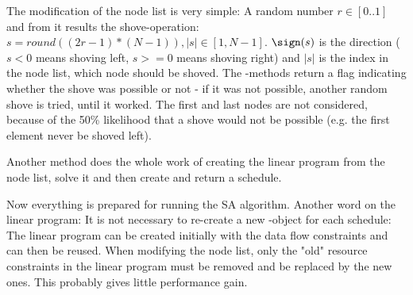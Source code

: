 The modification of the node list is very simple: A random number $r \in [0..1]$ and from it results the shove-operation: $s = round((2r-1)*(N-1)), |s| \in [1, N-1]$. $\sign(s)$ is the direction ($s<0$ means shoving left, $s>=0$ means shoving right) and $|s|$ is the index in the node list, which node should be shoved. The -methods return a flag indicating whether the shove was possible or not - if it was not possible, another random shove is tried, until it worked. The first and last nodes are not considered, because of the 50\% likelihood that a shove would not be possible (e.g. the first element never be shoved left).\par
Another method  does the whole work of creating the linear program from the node list, solve it and then create and return a schedule.\par
Now everything is prepared for running the SA algorithm. Another word on the linear program: It is not necessary to re-create a new -object for each schedule: The linear program can be created initially with the data flow constraints and can then be reused. When modifying the node list, only the "old" resource constraints in the linear program must be removed and be replaced by the new ones. This probably gives little performance gain.